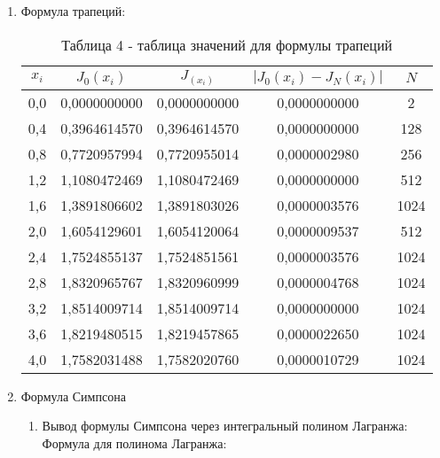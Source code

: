\documentclass[a4paper,12pt]{article}
\begin{document}
{\begin{enumerate}[label = \arabic*.]
{\begin{table}[h]
\begin{tabular}{|c|c|c|c|c|}
          \end{tabular}
          \caption*{\small{Таблица 3 - таблица значений для формулы центральных прямоугольников}}
        \end{table}
        \clearpage
    }
    \item {Формула трапеций:
        \begin{table}[h]
          \centering
          \begin{tabular}{|c|c|c|c|c|}
            \hline
            $x_i$ & $J_0(x_i)$ & $J_(x_i)$ & $\left|J_0(x_i) - J_N(x_i)\right|$ & $N$\\
            \hline
            0,0 & 0,0000000000 & 0,0000000000 & 0,0000000000 & 2 \\
            \hline
            0,4 & 0,3964614570 & 0,3964614570 & 0,0000000000 & 128 \\
            \hline
            0,8 & 0,7720957994 & 0,7720955014 & 0,0000002980 & 256 \\
            \hline
            1,2 & 1,1080472469 & 1,1080472469 & 0,0000000000 & 512 \\
            \hline
            1,6 & 1,3891806602 & 1,3891803026 & 0,0000003576 & 1024 \\
            \hline
            2,0 & 1,6054129601 & 1,6054120064 & 0,0000009537 & 512 \\
            \hline
            2,4 & 1,7524855137 & 1,7524851561 & 0,0000003576 & 1024 \\
            \hline
            2,8 & 1,8320965767 & 1,8320960999 & 0,0000004768 & 1024 \\
            \hline
            3,2 & 1,8514009714 & 1,8514009714 & 0,0000000000 & 1024 \\
            \hline
            3,6 & 1,8219480515 & 1,8219457865 & 0,0000022650 & 1024 \\
            \hline
            4,0 & 1,7582031488 & 1,7582020760 & 0,0000010729 & 1024 \\
            \hline
          \end{tabular}
          \caption*{\small{Таблица 4 - таблица значений для формулы трапеций}}
        \end{table}
    }
    \item Формула Симпсона
        \begin{enumerate}
            \item {Вывод формулы Симпсона через интегральный полином Лагранжа:\\
            Формула для полинома Лагранжа:
}
\end{enumerate}
\end{enumerate}}
\end{document}
